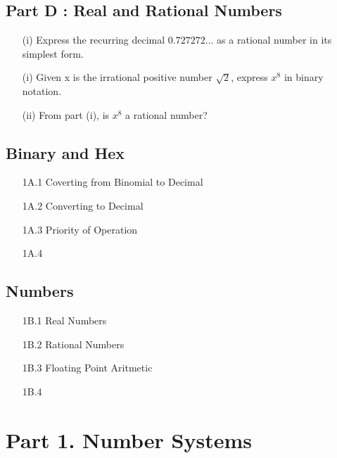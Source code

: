 \documentclass[]{report}
\begin{document}
	

	\subsection*{Part D : Real and Rational Numbers}
	\begin{itemize}
		\item[(i)] Express the recurring decimal $0.727272\ldots$ as a rational number in its simplest form.
	\end{itemize}
	\begin{itemize}
		\item[(i)] Given x is the irrational positive number $\sqrt{2}$, express $x^8$ in binary notation.
		\item[(ii)] From part (i), is $x^8$ a rational number?
	\end{itemize}
	
\subsection*{Binary and Hex}
\begin{itemize}
	\item[1A.1] Coverting from Binomial to Decimal
	\item[1A.2] Converting to Decimal
	\item[1A.3] Priority of Operation
	\item[1A.4] 
\end{itemize}

\subsection*{Numbers}
\begin{itemize}
	\item[1B.1] Real Numbers
	\item[1B.2] Rational Numbers
	\item[1B.3] Floating Point Aritmetic
	\item[1B.4] 
\end{itemize}

\section*{Part 1. Number Systems}
\end{document}
